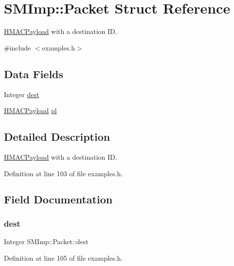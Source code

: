 \hypertarget{structSMImp_1_1Packet}{}\section{S\+M\+Imp\+:\+:Packet Struct Reference}
\label{structSMImp_1_1Packet}


\hyperlink{structSMImp_1_1HMACPayload}{H\+M\+A\+C\+Payload} with a destination ID.  




{\ttfamily \#include $<$examples.\+h$>$}

\subsection*{Data Fields}
\begin{DoxyCompactItemize}
\item 
Integer \hyperlink{structSMImp_1_1Packet_addc6be2ad98cf8034450b17911972ba3}{dest}
\item 
\hyperlink{structSMImp_1_1HMACPayload}{H\+M\+A\+C\+Payload} \hyperlink{structSMImp_1_1Packet_a67ec508fa97565dc38e45153b0211e89}{pl}
\end{DoxyCompactItemize}


\subsection{Detailed Description}
\hyperlink{structSMImp_1_1HMACPayload}{H\+M\+A\+C\+Payload} with a destination ID. 

Definition at line 103 of file examples.\+h.



\subsection{Field Documentation}
\mbox{\label{structSMImp_1_1Packet_addc6be2ad98cf8034450b17911972ba3}} 
\subsubsection{\texorpdfstring{dest}{dest}}
{\footnotesize\ttfamily Integer S\+M\+Imp\+::\+Packet\+::dest}



Definition at line 105 of file examples.\+h.

